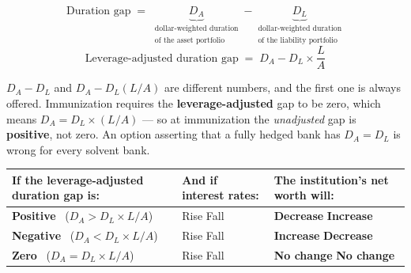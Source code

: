 \begin{lrfmlbox}
\[ \text{Duration gap} \;=\; \underbrace{D_A}_{\substack{\text{dollar-weighted duration}\\ \text{of the asset portfolio}}} - \underbrace{D_L}_{\substack{\text{dollar-weighted duration}\\ \text{of the liability portfolio}}} \]
\[ \text{Leverage-adjusted duration gap} \;=\; D_A - D_L \times \frac{L}{A} \]
\end{lrfmlbox}

\begin{lrtrapbox}
$D_A - D_L$ and $D_A - D_L(L/A)$ are different numbers, and the first one is always offered. Immunization requires the \textbf{leverage-adjusted} gap to be zero, which means $D_A = D_L \times (L/A)$ --- so at immunization the \emph{unadjusted} gap is \textbf{positive}, not zero. An option asserting that a fully hedged bank has $D_A = D_L$ is wrong for every solvent bank.
\end{lrtrapbox}

\begin{center}
\small
\begin{tabularx}{\textwidth}{@{}p{5.6cm} p{2.6cm} X@{}}
\toprule
\rowcolor{FRMSoft}\textbf{If the leverage-adjusted duration gap is:} & \textbf{And if interest rates:} & \textbf{The institution's net worth will:} \\
\midrule
\textbf{Positive} \ ($D_A > D_L \times L/A$) & Rise \newline Fall & \textbf{Decrease} \newline \textbf{Increase} \\
\addlinespace
\textbf{Negative} \ ($D_A < D_L \times L/A$) & Rise \newline Fall & \textbf{Increase} \newline \textbf{Decrease} \\
\addlinespace
\textbf{Zero} \ ($D_A = D_L \times L/A$) & Rise \newline Fall & \textbf{No change} \newline \textbf{No change} \\
\bottomrule
\end{tabularx}
\end{center}

